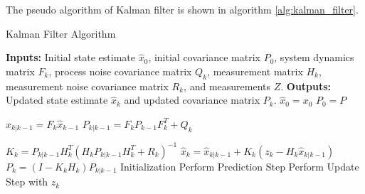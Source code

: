 The pseudo algorithm of Kalman filter is shown in algorithm \ref{alg:kalman_filter}.
\begin{algorithm}
    \caption{Kalman Filter Algorithm}
    \begin{algorithmic}[1]
        \State \textbf{Inputs:} Initial state estimate $\hat{x}_0$, initial covariance matrix $P_0$, system
        dynamics matrix $F_k$, process noise covariance matrix $Q_k$, measurement matrix $H_k$, measurement noise
        covariance matrix $R_k$, and measurements $Z$.
        \State \textbf{Outputs:} Updated state estimate $\hat{x}_k$ and updated covariance matrix $P_k$.
        \State
            \State $\hat{x}_0 = x_0$  
            \State $P_0 = P$ 
        \EndProcedure

        \State
            \State $\hat{x}_{k|k-1} = F_k \hat{x}_{k-1} $ 
            \State $P_{k|k-1} = F_k P_{k-1} F_k^T + Q_k$ 
        \EndProcedure

        \State
            \State $K_k = P_{k|k-1} H_k^T (H_k P_{k|k-1} H_k^T + R_k)^{-1}$ 
            \State $\hat{x}_k = \hat{x}_{k|k-1} + K_k(z_k - H_k \hat{x}_{k|k-1})$ 
            \State $P_k = (I - K_k H_k) P_{k|k-1}$ 
        \EndProcedure
        \State
            \State Initialization
                \State Perform Prediction Step
                \State Perform Update Step with $z_k$
            \EndFor
        \EndProcedure

    \end{algorithmic}
    \label{alg:kalman_filter}
\end{algorithm}